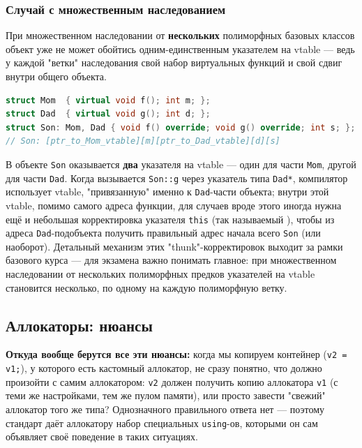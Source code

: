 \subsubsection{Случай с множественным наследованием}
При множественном наследовании от \textbf{нескольких} полиморфных базовых классов объект уже не может обойтись одним-единственным указателем на vtable --- ведь у каждой "ветки" наследования свой набор виртуальных функций и свой сдвиг внутри общего объекта.
\begin{lstlisting}[language=C++]
struct Mom  { virtual void f(); int m; };
struct Dad  { virtual void g(); int d; };
struct Son: Mom, Dad { void f() override; void g() override; int s; };
// Son: [ptr_to_Mom_vtable][m][ptr_to_Dad_vtable][d][s]
\end{lstlisting}
В объекте \texttt{Son} оказывается \textbf{два} указателя на vtable --- один для части \texttt{Mom}, другой для части \texttt{Dad}. Когда вызывается \texttt{Son::g} через указатель типа \texttt{Dad*}, компилятор использует vtable, "привязанную" именно к \texttt{Dad}-части объекта; внутри этой vtable, помимо самого адреса функции, для случаев вроде этого иногда нужна ещё и небольшая корректировка указателя \texttt{this} (так называемый ), чтобы из адреса \texttt{Dad}-подобъекта получить правильный адрес начала всего \texttt{Son} (или наоборот). Детальный механизм этих "thunk"-корректировок выходит за рамки базового курса --- для экзамена важно понимать главное: при множественном наследовании от нескольких полиморфных предков указателей на vtable становится несколько, по одному на каждую полиморфную ветку.

\subsection{Аллокаторы: нюансы}
\textbf{Откуда вообще берутся все эти нюансы:} когда мы копируем контейнер (\texttt{v2 = v1;}), у которого есть кастомный аллокатор, не сразу понятно, что должно произойти с самим аллокатором: \texttt{v2} должен получить копию аллокатора \texttt{v1} (с теми же настройками, тем же пулом памяти), или просто завести "свежий" аллокатор того же типа? Однозначного правильного ответа нет --- поэтому стандарт даёт аллокатору набор специальных \texttt{using}-ов, которыми он сам объявляет своё поведение в таких ситуациях.
